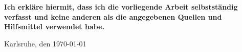 \thispagestyle{empty}

\textbf{Ich erkläre hiermit, dass ich die vorliegende Arbeit selbstständig verfasst und keine
anderen als die angegebenen Quellen und Hilfsmittel verwendet habe.}

\vspace{2cm}

 \hspace{5cm} Karlsruhe, den \today
